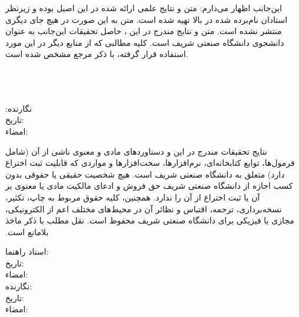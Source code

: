 {\vspace{0.2em}
این‌جانب {\ThesisAuthor} اظهار می‌دارم:
 متن و نتایج علمی ارائه شده در این \ThesisType{} اصیل بوده و زیرنظر استادان نام‌برده ‌شده در بالا تهیه شده است.
 متن \ThesisType{} به این صورت در هیچ جای دیگری منتشر نشده است.
 متن و نتایج مندرج در این \ThesisType، حاصل تحقیقات این‌جانب به عنوان دانشجوی \ThesisDegree{} دانشگاه صنعتی شریف است.
 کلیه مطالبی که از منابع دیگر در این \ThesisType{} مورد استفاده قرار گرفته، با ذکر مرجع مشخص شده است.
‫
\begin{multicols}{2}
\ \\
\ \\
\ \\
‫
نگارنده: \ThesisAuthor\\
تاریخ: \\
امضاء: \\
\end{multicols}
‫
‫نتایج تحقیقات مندرج در این \ThesisType{} و دستاوردهای مادی و معنوی ناشی از آن (شامل فرمول‌ها، توابع کتابخانه‌ای، نرم‌افزارها، سخت‌افزارها و مواردی که قابلیت ثبت اختراع دارد) متعلق به دانشگاه صنعتی شریف است. هیچ شخصیت حقیقی یا حقوقی بدون کسب اجازه از دانشگاه صنعتی شریف حق فروش و ادعای مالکیت مادی یا معنوی بر آن یا ثبت اختراع از آن را ندارد. همچنین، کلیه حقوق مربوط به چاپ، تکثیر، نسخه‌برداری، ترجمه، اقتباس و نظائر آن در محیط‌های مختلف اعم از الکترونیکی، مجازی یا فیزیکی برای دانشگاه صنعتی شریف محفوظ است. نقل مطلب با ذکر ماخذ بلامانع است.
‫

\begin{multicols}{2}
استاد راهنما: \ThesisSupervisor \\
تاریخ: \\
امضاء: \\

نگارنده: \ThesisAuthor\\
تاریخ: \\
امضاء: \\
\end{multicols}
}

